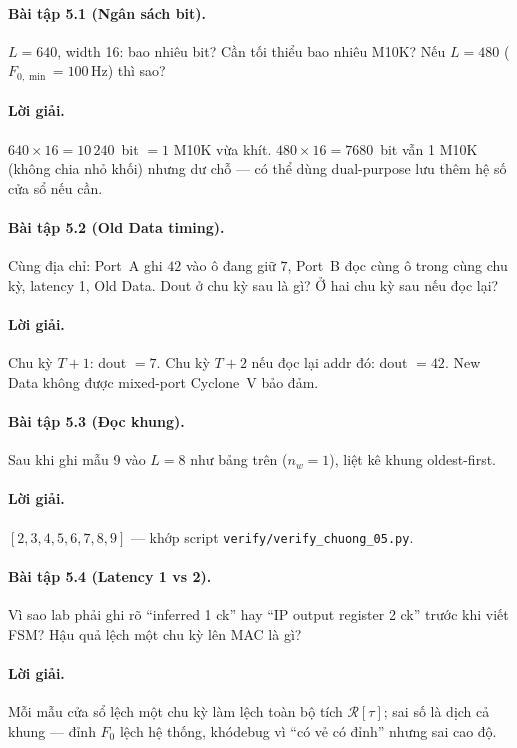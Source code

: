 \paragraph{Bài tập 5.1 (Ngân sách bit).} $L=640$, width 16: bao nhiêu bit? Cần tối thiểu bao nhiêu M10K? Nếu $L=480$ ($F_{0,\min}=100\,\text{Hz}$) thì sao?
\paragraph{Lời giải.} $640\times 16=10\,240$~bit $=1$ M10K vừa khít. $480\times 16=7680$~bit vẫn 1 M10K (không chia nhỏ khối) nhưng dư chỗ --- có thể dùng dual-purpose lưu thêm hệ số cửa sổ nếu cần.

\paragraph{Bài tập 5.2 (Old Data timing).} Cùng địa chỉ: Port~A ghi $42$ vào ô đang giữ $7$, Port~B đọc cùng ô trong cùng chu kỳ, latency 1, Old Data. Dout ở chu kỳ sau là gì? Ở hai chu kỳ sau nếu đọc lại?
\paragraph{Lời giải.} Chu kỳ $T{+}1$: dout $=7$. Chu kỳ $T{+}2$ nếu đọc lại addr đó: dout $=42$. New Data không được mixed-port Cyclone~V bảo đảm.

\paragraph{Bài tập 5.3 (Đọc khung).} Sau khi ghi mẫu 9 vào $L=8$ như bảng trên ($n_w=1$), liệt kê khung oldest-first.
\paragraph{Lời giải.} $[2,3,4,5,6,7,8,9]$ --- khớp script \texttt{verify/verify\_chuong\_05.py}.

\paragraph{Bài tập 5.4 (Latency 1 vs 2).} Vì sao lab phải ghi rõ ``inferred 1 ck'' hay ``IP output register 2 ck'' trước khi viết FSM? Hậu quả lệch một chu kỳ lên MAC là gì?
\paragraph{Lời giải.} Mỗi mẫu cửa sổ lệch một chu kỳ làm lệch toàn bộ tích $\mathcal{R}[\tau]$; sai số là dịch cả khung --- đỉnh $F_0$ lệch hệ thống, khódebug vì ``có vẻ có đỉnh'' nhưng sai cao độ.


